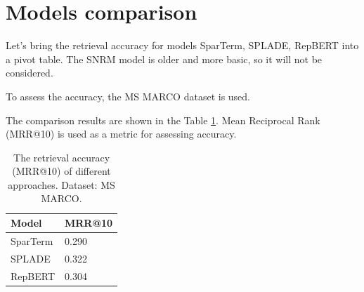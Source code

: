 \documentclass[
    twocolumn,
]{ceurart}
\begin{document}


    \section{Models comparison}

    Let's bring the retrieval accuracy for models SparTerm, SPLADE, RepBERT into a pivot table.
    The SNRM model is older and more basic, so it will not be considered.

    To assess the accuracy, the MS MARCO dataset\cite{MS-MARCO} is used.

    The comparison results are shown in the Table \ref{tab:evaluation}.
    Mean Reciprocal Rank (MRR@10) is used as a metric for assessing accuracy.

    \begin{table}[h]
        \caption{The retrieval accuracy (MRR@10) of different approaches. Dataset: MS MARCO.}
        \label{tab:evaluation}
        \begin{tabular}{p{}|p{}}
            \toprule
            Model                   & MRR@10 \\
            \midrule
            SparTerm\cite{SparTerm} & 0.290  \\
            SPLADE\cite{SPLADE}     & 0.322  \\
            RepBERT\cite{RepBERT}   & 0.304  \\
            \bottomrule
        \end{tabular}
    \end{table}
\end{document}
